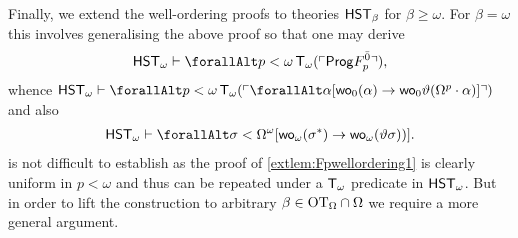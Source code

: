 \documentclass[UKenglish,cleveref,DIV=12]{scrartcl}
\let\forall\forallAlt
\theoremstyle{definition}
\theoremstyle{definition}
\begin{document}
Finally, we extend the well-ordering proofs to theories $\mathsf{HST}_\beta$ for
$\beta\ge\omega$. For $\beta=\omega$ this involves generalising the above proof
so that one may derive
\begin{align}\label{eqn:Fbetawellordering0.1}
  \HST_\omega\proves\forall p<\omega\,\T_\omega(\gn{\Prog F_p^{\bar0}}),
\end{align}
whence $\HST_\omega \proves\forall
p<\omega\,\T_\omega(\gn{\forall\alpha[\wo_{0}(\alpha)\rightarrow\wo_{0}
\vartheta(\Omega^p\cdot\alpha)]})$ and also
\begin{align*}
  \HST_\omega\proves \forall\sigma<\Omega^\omega[\wo_\omega(\sigma^*)\rightarrow
  \wo_\omega(\vartheta\sigma))].
\end{align*}
 is not difficult to establish as the proof of
\cref{extlem:Fpwellordering1} is clearly uniform in $p<\omega$ and thus can be
repeated under a $\mathsf{T}_\omega$ predicate in $\mathsf{HST}_\omega$. But in order to lift the
construction to arbitrary $\beta\in\mathrm{OT}_\Omega\cap\Omega$ we require a more
general argument.
\end{document}
